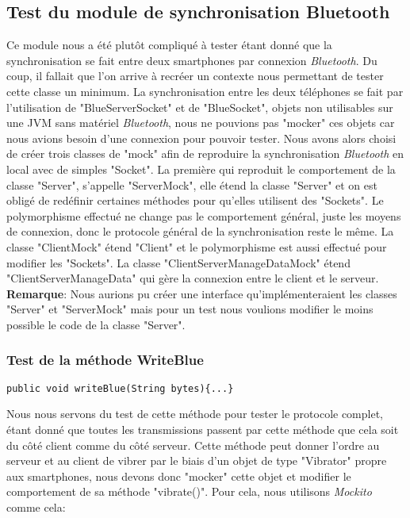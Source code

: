 \subsection{Test du module de synchronisation Bluetooth}

Ce module nous a été plutôt compliqué à tester étant donné que la synchronisation se fait entre deux smartphones par connexion \textit{Bluetooth}. Du coup, il fallait que l'on arrive à recréer un contexte nous permettant de tester cette classe un minimum. La synchronisation entre les deux téléphones se fait par l'utilisation de "BlueServerSocket" et de "BlueSocket", objets non utilisables sur une JVM sans matériel \textit{Bluetooth}, nous ne pouvions pas "mocker" ces objets car nous avions besoin d'une connexion pour pouvoir tester. Nous avons alors choisi de créer trois classes de "mock" afin de reproduire la synchronisation \textit{Bluetooth} en local avec de simples "Socket". La première qui reproduit le comportement de la classe "Server", s'appelle "ServerMock", elle étend la classe "Server" et on est obligé de redéfinir certaines méthodes pour qu'elles utilisent des "Sockets". Le polymorphisme effectué ne change pas le comportement général, juste les moyens de connexion, donc le protocole général de la synchronisation reste le même. La classe "ClientMock" étend "Client" et le polymorphisme est aussi effectué pour modifier les "Sockets". La classe "ClientServerManageDataMock" étend "ClientServerManageData" qui gère la connexion entre le client et le serveur.\\

\textbf{Remarque}: Nous aurions pu créer une interface qu'implémenteraient les classes "Server" et "ServerMock" mais pour un test nous voulions modifier le moins possible le code de la classe "Server".

\subsubsection{Test de la méthode WriteBlue}

\begin{lstlisting}
public void writeBlue(String bytes){...}
\end{lstlisting}\bigskip

Nous nous servons du test de cette méthode pour tester le protocole complet, étant donné que toutes les transmissions passent par cette méthode que cela soit du côté client comme du côté serveur. Cette méthode peut donner l'ordre au serveur et au client de vibrer par le biais d'un objet de type "Vibrator" propre aux smartphones, nous devons donc "mocker" cette objet et modifier le comportement de sa méthode "vibrate()". Pour cela, nous utilisons \textit{Mockito} comme cela:

